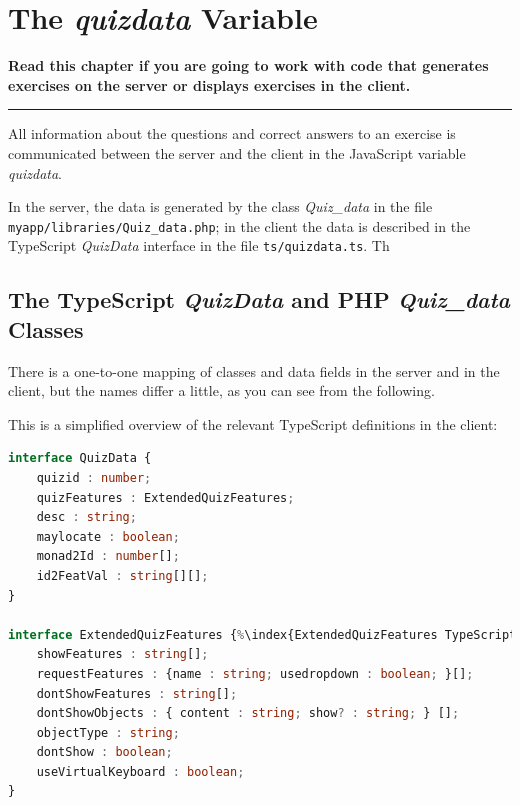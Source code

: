 \documentclass[11pt,oneside,a4paper]{memoir}
\begin{document}
\chapter{The \emph{quizdata} Variable}\label{chap-quizdata}%

\textbf{Read this chapter if you are going to work with code that generates exercises on
  the server or displays exercises in the client.} 
\plainbreak{3}

All information about the questions and correct answers to an exercise is communicated between the
server and the client in the JavaScript variable \emph{quizdata}.

In the server, the data is generated by the class \emph{Quiz\_data} in the file
\texttt{myapp/\allowbreak{}libraries/\allowbreak{}Quiz\_data.php}; in the client the data is described in the TypeScript
\emph{QuizData} interface in the file \texttt{ts/quizdata.ts}. Th



\section{The TypeScript \emph{QuizData} and PHP \emph{Quiz\_data} Classes}%
%

There is a one-to-one mapping of classes and data fields in the server and in the client, but the
names differ a little, as you can see from the following.

This is a simplified overview of the relevant TypeScript definitions in the client:

\begin{lstlisting}[language=TypeScript]
interface QuizData {
    quizid : number;
    quizFeatures : ExtendedQuizFeatures;
    desc : string;
    maylocate : boolean;
    monad2Id : number[];
    id2FeatVal : string[][];
}

interface ExtendedQuizFeatures {%\index{ExtendedQuizFeatures TypeScript interface@\emph{ExtendedQuizFeatures} TypeScript interface}%
    showFeatures : string[];
    requestFeatures : {name : string; usedropdown : boolean; }[];
    dontShowFeatures : string[];
    dontShowObjects : { content : string; show? : string; } [];
    objectType : string;
    dontShow : boolean;
    useVirtualKeyboard : boolean;
}
\end{lstlisting}
\end{document}
